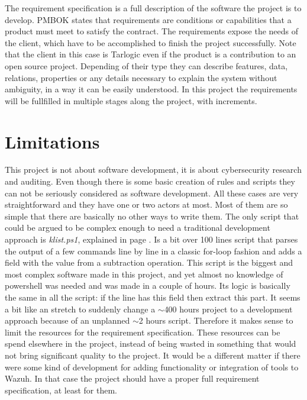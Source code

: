 
The requirement specification is a full description of the software the project is to develop.
\linej
PMBOK\cite{pmbok} states that requirements are conditions or capabilities that a product must meet to satisfy the contract.
The requirements expose the needs of the client, which have to be accomplished to finish the project successfully.
Note that the client in this case is Tarlogic even if the product is a contribution to an open source project.
\linej
Depending of their type they can describe features, data, relations, properties or any details necessary to explain the system without ambiguity, in a way it can be easily understood.
\linej
\linej
In this project the requirements will be fullfilled in multiple stages along the project, with increments.

\section{Limitations}
This project is not about software development, it is about cybersecurity research and auditing.
\linej
Even though there is some basic creation of rules and scripts they can not be seriously considered as software development.
All these cases are very straightforward and they have one or two actors at most.
Most of them are so simple that there are basically no other ways to write them.
\linej
\linej
The only script that could be argued to be complex enough to need a traditional development approach is \textit{klist.ps1}\cite{memoria_github}, explained in page \pageref{klist_detection}. Is a bit over 100 lines script that parses the output of a few commands line by line in a classic for-loop fashion and adds a field with the value from a subtraction operation.
\linej
This script is the biggest and most complex software made in this project, and yet almost no knowledge of powershell was needed and was made in a couple of hours.
Its logic is basically the same in all the script: if the line has this field then extract this part.
\linej
It seems a bit like an stretch to suddenly change a $\sim$400 hours project to a development approach because of an unplanned $\sim$2 hours script.
\linej
\linej
Therefore it makes sense to limit the resources for the requirement specification. These resources can be spend elsewhere in the project, instead of being wasted in something that would not bring significant quality to the project.
\linej
It would be a different matter if there were some kind of development for adding functionality or integration of tools to Wazuh. In that case the project should have a proper full requirement specification, at least for them.

